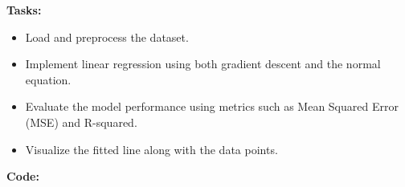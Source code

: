 \documentclass[12pt, a4paper]{article}
\begin{document}
\vspace{\baselineskip}
\noindent \textbf{Tasks:}\\
\vspace{-0.5\baselineskip}
\begin{itemize}[nosep]
    \item Load and preprocess the dataset.
    \item Implement linear regression using both gradient descent and the normal equation.
    \item Evaluate the model performance using metrics such as Mean Squared Error (MSE) and R-squared.
    \item Visualize the fitted line along with the data points.
\end{itemize}

\vspace{\baselineskip}
\noindent \textbf{Code:}\\
\end{document}
